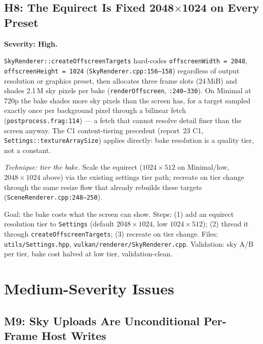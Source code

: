 \documentclass[11pt,a4paper]{article}
\begin{document}
\subsection{H8: The Equirect Is Fixed 2048$\times$1024 on Every Preset}
\label{sec:h8}

\textbf{Severity: High.}

\texttt{SkyRenderer::createOffscreenTargets} hard-codes
\texttt{offscreenWidth = 2048}, \texttt{offscreenHeight = 1024}
(\texttt{SkyRenderer.cpp:156--158}) regardless of output resolution or
graphics preset, then allocates three frame slots (24\,MiB) and shades
2.1\,M sky pixels per bake (\texttt{renderOffscreen}, \texttt{:240--330}).
On Minimal at 720p the bake shades more sky pixels than the screen has,
for a target sampled exactly once per background pixel through a bilinear
fetch (\texttt{postprocess.frag:114}) --- a fetch that cannot resolve detail
finer than the screen anyway. The C1 content-tiering precedent (report~23
C1, \texttt{Settings::textureArraySize}) applies directly: bake resolution
is a quality tier, not a constant.

\textit{Technique: tier the bake.} Scale the equirect ($1024\times512$ on
Minimal/low, $2048\times1024$ above) via the existing settings tier path;
recreate on tier change through the same resize flow that already rebuilds
these targets (\texttt{SceneRenderer.cpp:248--250}).

\begin{tcolorbox}[promptbox={Prompt --- H8: tiered equirect resolution}]
Goal: the bake costs what the screen can show. Steps: (1) add an equirect
resolution tier to \texttt{Settings} (default $2048\times1024$, low
$1024\times512$); (2) thread it through \texttt{createOffscreenTargets};
(3) recreate on tier change. Files: \texttt{utils/Settings.hpp},
\texttt{vulkan/renderer/SkyRenderer.cpp}. Validation: sky A/B per tier,
bake cost halved at low tier, validation-clean.
\end{tcolorbox}

\section{Medium-Severity Issues}

\subsection{M9: Sky Uploads Are Unconditional Per-Frame Host Writes}
\label{sec:m9}
\end{document}

